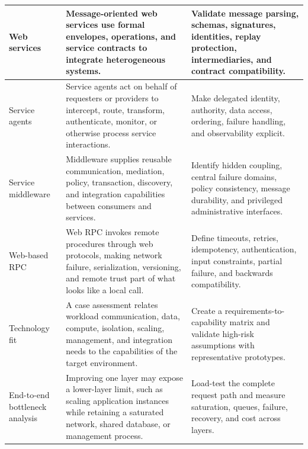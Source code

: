 \documentclass[11pt]{article}
\begin{document}
\begin{longtable}{@{}>{\RaggedRight\arraybackslash}p{}>{\RaggedRight\arraybackslash}p{}>{\RaggedRight\arraybackslash}p{}@{}}
Web services & Message-oriented web services use formal envelopes, operations, and service contracts to integrate heterogeneous systems. & Validate message parsing, schemas, signatures, identities, replay protection, intermediaries, and contract compatibility. \\\midrule
Service agents & Service agents act on behalf of requesters or providers to intercept, route, transform, authenticate, monitor, or otherwise process service interactions. & Make delegated identity, authority, data access, ordering, failure handling, and observability explicit. \\\midrule
Service middleware & Middleware supplies reusable communication, mediation, policy, transaction, discovery, and integration capabilities between consumers and services. & Identify hidden coupling, central failure domains, policy consistency, message durability, and privileged administrative interfaces. \\\midrule
Web-based RPC & Web RPC invokes remote procedures through web protocols, making network failure, serialization, versioning, and remote trust part of what looks like a local call. & Define timeouts, retries, idempotency, authentication, input constraints, partial failure, and backwards compatibility. \\\midrule
Technology fit & A case assessment relates workload communication, data, compute, isolation, scaling, management, and integration needs to the capabilities of the target environment. & Create a requirements-to-capability matrix and validate high-risk assumptions with representative prototypes. \\\midrule
End-to-end bottleneck analysis & Improving one layer may expose a lower-layer limit, such as scaling application instances while retaining a saturated network, shared database, or management process. & Load-test the complete request path and measure saturation, queues, failure, recovery, and cost across layers. \\\midrule
\bottomrule
\end{longtable}
\endgroup
\end{document}
